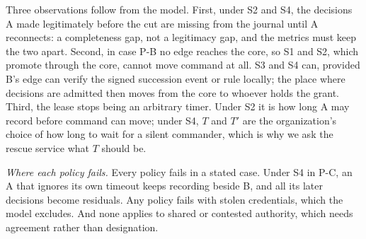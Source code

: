 Three observations follow from the model. First, under S2 and S4, the decisions A made
legitimately before the cut are missing from the journal until A reconnects: a
completeness gap, not a legitimacy gap, and the metrics must keep the two apart. Second,
in case P-B no edge reaches the core, so S1 and S2, which promote through the core,
cannot move command at all. S3 and S4 can, provided B's edge can verify the signed
succession event or rule locally; the place where decisions are admitted then moves from
the core to whoever holds the grant. 
Third, the lease stops being an arbitrary timer. Under S2 it is how long A may record
before command can move; under S4, $T$ and $T'$ are the organization's choice of how long
to wait for a silent commander, which is why we ask the rescue service what $T$ should be.

\textit{Where each policy fails.} Every policy fails in a stated case. Under S4 in P-C,
an A that ignores its own timeout keeps recording beside B, and all its later decisions
become residuals. Any policy fails with stolen credentials, which the model excludes. And
none applies to shared or contested authority, which needs agreement rather than
designation.

